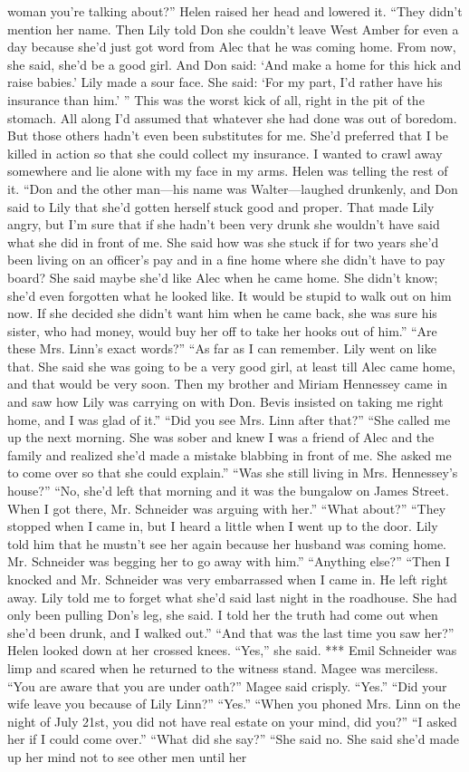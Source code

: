 \documentclass{novel}
\begin{document}
woman you’re talking about?” Helen raised her head and lowered it. “They didn’t mention her name. Then Lily told Don she couldn’t leave West Amber for even a day because she’d just got word from Alec that he was coming home. From now, she said, she’d be a good girl. And Don said: ‘And make a home for this hick and raise babies.’ Lily made a sour face. She said: ‘For my part, I’d rather have his insurance than him.’ ” This was the worst kick of all, right in the pit of the stomach. All along I’d assumed that whatever she had done was out of boredom. But those others hadn’t even been substitutes for me. She’d preferred that I be killed in action so that she could collect my insurance. I wanted to crawl away somewhere and lie alone with my face in my arms. Helen was telling the rest of it. “Don and the other man—his name was Walter—laughed drunkenly, and Don said to Lily that she’d gotten herself stuck good and proper. That made Lily angry, but I’m sure that if she hadn’t been very drunk she wouldn’t have said what she did in front of me. She said how was she stuck if for two years she’d been living on an officer’s pay and in a fine home where she didn’t have to pay board? She said maybe she’d like Alec when he came home. She didn’t know; she’d even forgotten what he looked like. It would be stupid to walk out on him now. If she decided she didn’t want him when he came back, she was sure his sister, who had money, would buy her off to take her hooks out of him.” “Are these Mrs. Linn’s exact words?” “As far as I can remember. Lily went on like that. She said she was going to be a very good girl, at least till Alec came home, and that would be very soon. Then my brother and Miriam Hennessey came in and saw how Lily was carrying on with Don. Bevis insisted on taking me right home, and I was glad of it.” “Did you see Mrs. Linn after that?” “She called me up the next morning. She was sober and knew I was a friend of Alec and the family and realized she’d made a mistake blabbing in front of me. She asked me to come over so that she could explain.” “Was she still living in Mrs. Hennessey’s house?” “No, she’d left that morning and it was the bungalow on James Street. When I got there, Mr. Schneider was arguing with her.” “What about?” “They stopped when I came in, but I heard a little when I went up to the door. Lily told him that he mustn’t see her again because her husband was coming home. Mr. Schneider was begging her to go away with him.” “Anything else?” “Then I knocked and Mr. Schneider was very embarrassed when I came in. He left right away. Lily told me to forget what she’d said last night in the roadhouse. She had only been pulling Don’s leg, she said. I told her the truth had come out when she’d been drunk, and I walked out.” “And that was the last time you saw her?” Helen looked down at her crossed knees. “Yes,” she said. *** Emil Schneider was limp and scared when he returned to the witness stand. Magee was merciless. “You are aware that you are under oath?” Magee said crisply. “Yes.” “Did your wife leave you because of Lily Linn?” “Yes.” “When you phoned Mrs. Linn on the night of July 21st, you did not have real estate on your mind, did you?” “I asked her if I could come over.” “What did she say?” “She said no. She said she’d made up her mind not to see other men until her 
\end{document}
